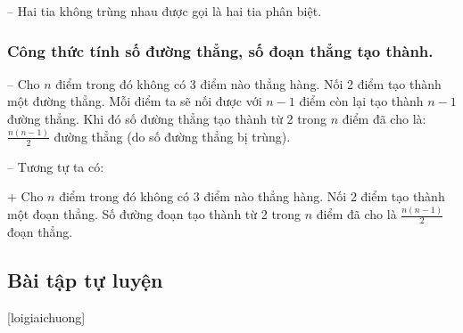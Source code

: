 -- Hai tia không trùng nhau được gọi là hai tia phân biệt.
\subsubsection{Công thức tính số đường thẳng, số đoạn thẳng tạo thành.}
-- Cho $n$ điểm trong đó không có 3 điểm nào thẳng hàng. Nối 2 điểm tạo thành một đường thẳng. Mỗi điểm ta sẽ nối được với $n-1$ điểm còn lại tạo thành $n-1$ đường thẳng.
Khi đó số đường thẳng tạo thành từ 2 trong $n$ điểm đã cho là: $\frac{n(n-1)}{2}$  đường thẳng  (do số đường thẳng bị trùng).

-- Tương tự ta có: 

+ Cho $n$ điểm trong đó không có 3 điểm nào thẳng hàng. Nối 2 điểm tạo thành một đoạn thẳng. Số đường đoạn tạo thành từ 2 trong $n$ điểm đã cho là $\frac{n(n-1)}{2}$ đoạn thẳng.
\subsection{Bài tập tự luyện}
[loigiaichuong]
